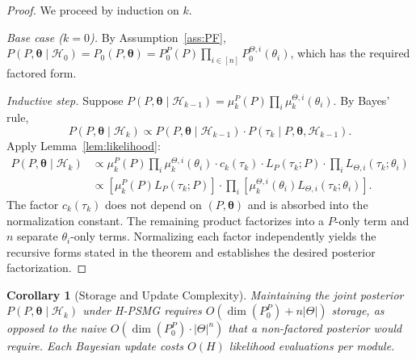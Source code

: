 \documentclass{article}
\newtheorem{corollary}[theorem]{Corollary}
\begin{document}
\begin{proof}
We proceed by induction on $k$.

\textit{Base case ($k=0$).} By Assumption~\ref{ass:PF}, $P(P, \boldsymbol{\theta} \mid \mathcal{H}_0) = P_0(P, \boldsymbol{\theta}) = P_0^P(P) \prod_{i \in [n]} P_0^{\Theta,i}(\theta_i)$, which has the required factored form.

\textit{Inductive step.} Suppose $P(P, \boldsymbol{\theta} \mid \mathcal{H}_{k-1}) = \mu_k^P(P) \prod_{i} \mu_k^{\Theta,i}(\theta_i)$. By Bayes' rule,
\begin{equation}
P(P, \boldsymbol{\theta} \mid \mathcal{H}_k) \propto P(P, \boldsymbol{\theta} \mid \mathcal{H}_{k-1}) \cdot P(\tau_k \mid P, \boldsymbol{\theta}, \mathcal{H}_{k-1}).
\end{equation}
Apply Lemma~\ref{lem:likelihood}:
\begin{align}
P(P, \boldsymbol{\theta} \mid \mathcal{H}_k) &\propto \mu_k^P(P) \prod_{i} \mu_k^{\Theta,i}(\theta_i) \cdot c_k(\tau_k) \cdot L_P(\tau_k; P) \cdot \prod_{i} L_{\Theta,i}(\tau_k; \theta_i) \\
&\propto \left[\mu_k^P(P) L_P(\tau_k; P)\right] \cdot \prod_{i} \left[\mu_k^{\Theta,i}(\theta_i) L_{\Theta,i}(\tau_k; \theta_i)\right].
\end{align}
The factor $c_k(\tau_k)$ does not depend on $(P, \boldsymbol{\theta})$ and is absorbed into the normalization constant. The remaining product factorizes into a $P$-only term and $n$ separate $\theta_i$-only terms. Normalizing each factor independently yields the recursive forms stated in the theorem and establishes the desired posterior factorization.
\end{proof}

\begin{corollary}[Storage and Update Complexity]
\label{cor:storage}
Maintaining the joint posterior $P(P, \boldsymbol{\theta} \mid \mathcal{H}_k)$ under H-PSMG requires $O\left(\dim(P_0^P) + n |\Theta|\right)$ storage, as opposed to the naive $O\left(\dim(P_0^P) \cdot |\Theta|^n\right)$ that a non-factored posterior would require. Each Bayesian update costs $O(H)$ likelihood evaluations per module.
\end{corollary}
\end{document}
